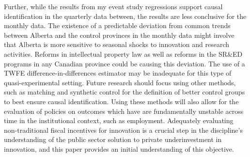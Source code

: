 \documentclass[../main.tex]{subfiles}
\begin{document}
Further, while the results from my event study regressions support causal identification in the quarterly data between, the results are less conclusive for the monthly data. The existence of a predictable deviation from common trends between Alberta and the control provinces in the monthly data might involve that Alberta is more sensitive to seasonal shocks to innovation and research activities. Reforms in intellectual property law as well as reforms in the SR\&ED programs in any Canadian province could be causing this deviation. The use of a TWFE difference-in-differences estimator may be inadequate for this type of quasi-experimental setting. Future research should focus using other methods, such as matching \parencite{caliendo_kopeinig08a} and synthetic control \parencite{abadie_etal10} for the definition of better control groups to best ensure causal identification. Using these methods will also allow for the evaluation of policies on outcomes which have are fundamentally unstable across time in the institutional context, such as employment. Adequately evaluating non-traditional fiscal incentives for innovation is a crucial step in the discipline's understanding of the public sector solution to private underinvestment in innovation, and this paper provides an initial understanding of this objective. 
\end{document}
